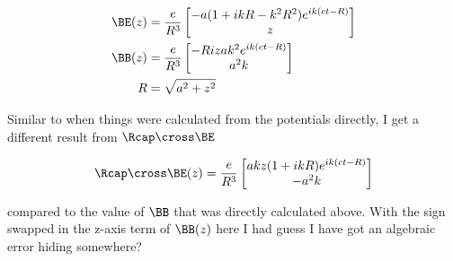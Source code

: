 {\begin{equation}\label{eqn:relativisticElectrodynamicsExamReflection:1020}
\begin{aligned}
\BE(z)
&= 
\frac{e}{R^3}
\begin{bmatrix}
- a (1 + i k R - k^2 R^2 ) e^{i k (c t - R)} \\
z 
\end{bmatrix} \\
\BB(z)
&= 
\frac{e}{R^3}
\begin{bmatrix}
-R i z a k^2 e^{i k (c t - R)} \\
a^2 k 
\end{bmatrix} \\
R &= \sqrt{a^2 + z^2} 
\end{aligned}
\end{equation}

Similar to when things were calculated from the potentials directly, I get a different result from $\Rcap \cross \BE$

\begin{equation}\label{eqn:relativisticElectrodynamicsExamReflection:1030}
\Rcap \cross \BE(z) = \frac{e}{R^3}
\begin{bmatrix}
a k z (1 + i k R) e^{i k (c t - R)} \\
-a^2 k 
\end{bmatrix}
\end{equation}

compared to the value of $\BB$ that was directly calculated above.  With the sign swapped in the z-axis term of $\BB(z)$ here I had guess I have got an algebraic error hiding somewhere?

} %

